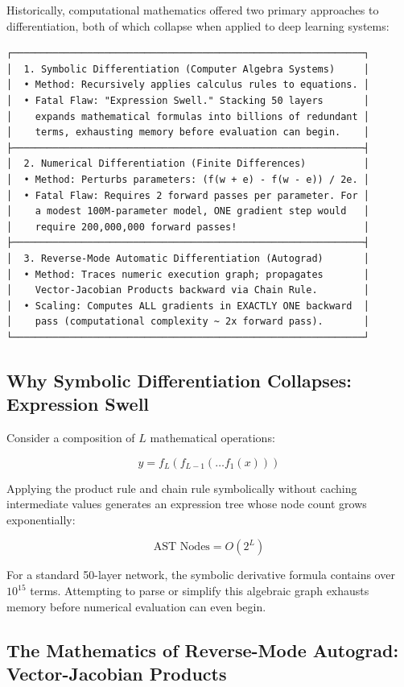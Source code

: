 \documentclass[
  letterpaper,
]{scrbook}
\begin{document}
Historically, computational mathematics offered two primary approaches
to differentiation, both of which collapse when applied to deep learning
systems:

\begin{verbatim}
┌─────────────────────────────────────────────────────────────┐
│  1. Symbolic Differentiation (Computer Algebra Systems)     │
│  • Method: Recursively applies calculus rules to equations. │
│  • Fatal Flaw: "Expression Swell." Stacking 50 layers       │
│    expands mathematical formulas into billions of redundant │
│    terms, exhausting memory before evaluation can begin.    │
├─────────────────────────────────────────────────────────────┤
│  2. Numerical Differentiation (Finite Differences)          │
│  • Method: Perturbs parameters: (f(w + e) - f(w - e)) / 2e. │
│  • Fatal Flaw: Requires 2 forward passes per parameter. For │
│    a modest 100M-parameter model, ONE gradient step would   │
│    require 200,000,000 forward passes!                      │
├─────────────────────────────────────────────────────────────┤
│  3. Reverse-Mode Automatic Differentiation (Autograd)       │
│  • Method: Traces numeric execution graph; propagates       │
│    Vector-Jacobian Products backward via Chain Rule.        │
│  • Scaling: Computes ALL gradients in EXACTLY ONE backward  │
│    pass (computational complexity ~ 2x forward pass).       │
└─────────────────────────────────────────────────────────────┘
\end{verbatim}

\subsection{Why Symbolic Differentiation Collapses: Expression
Swell}\label{why-symbolic-differentiation-collapses-expression-swell}

Consider a composition of \(L\) mathematical operations:

\[y = f_L(f_{L-1}(\dots f_1(x)))\]

Applying the product rule and chain rule symbolically without caching
intermediate values generates an expression tree whose node count grows
exponentially:

\[\text{AST Nodes} = O(2^L)\]

For a standard 50-layer network, the symbolic derivative formula
contains over \(10^{15}\) terms. Attempting to parse or simplify this
algebraic graph exhausts memory before numerical evaluation can even
begin.

\subsection{The Mathematics of Reverse-Mode Autograd: Vector-Jacobian
Products}\label{the-mathematics-of-reverse-mode-autograd-vector-jacobian-products}
\end{document}
